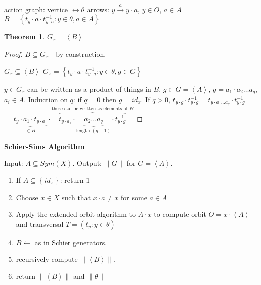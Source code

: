 \documentclass[12pt]{amsart}
\newtheorem{theorem}{Theorem}[section]
\theoremstyle{definition}
\begin{document}
action graph: vertice $\leftrightarrow \theta$
arrows: $y \stackrel{a}{\rightarrow} y \cdot a$, $y \in O$, $a \in A$
$B = \left\{ t_{y} \cdot a \cdot t_{y \cdot a}^{- 1} : y \in \theta, a \in A \right\}$

\begin{theorem}
$G_{x} = \left\langle B \right\rangle$
\end{theorem}

\begin{proof}
$B \subseteq G_{x}$ - by construction.

$G_{x} \subseteq \left\langle B \right\rangle$
$G_{x} = \left\{ t_{y} \cdot a \cdot t_{y \cdot g}^{ - 1 } : y \in \theta, g \in G \right\}$

$y \in G_{x}$ can be written as a product of things in $B$. $g \in G = \left\langle A \right\rangle$, $g = a_{1} \cdot a_{2} \ldots a_{q}$, $a_{i} \in A$. Induction on $q$: if $q = 0$ then $g = id_{x}$.
If $q > 0$, $t_{y \cdot g} \cdot t_{y \cdot g}^{- 1} = t_{y \cdot a_{1} \ldots a_{q}} \cdot t_{y \cdot g}^{ - 1}$
$ = \underbrace{t_{y} \cdot a_{1} \cdot t_{y \cdot a_{1}}}_{ \in B} \cdot \overbrace{t_{y \cdot a_{1}} \cdot \underbrace{a_{2} \ldots a_{q}}_{\text{length } \left( q - 1\right) } \cdot t_{y \cdot g}^{ - 1}}^{\text{these can be written as elements of } B}$
\end{proof}

\begin{center}
\textbf{Schier-Sims Algorithm}
\end{center}

Input: $A \subseteq Sym(X)$. Output: $\| G \|$ for $G = \left\langle A \right\rangle$.

\begin{enumerate}
\item If $A \subseteq \left\{ id_{x} \right\}$: return 1
\item Choose $x \in X$ such that $x \cdot a \neq x$ for some $a \in A$
\item Apply the extended orbit algorithm to $A \cdot x$ to compute orbit $O = x \cdot \left\langle A \right\rangle$ and transversal $T = \left( t_{y} : y \in \theta \right)$
\item $B \leftarrow$ as in Schier generators.
\item recursively compute $\| \left\langle B \right\rangle \|$.
\item return $\| \left\langle B \right\rangle \|$ and $\| \theta \|$
\end{enumerate}
\end{document}
